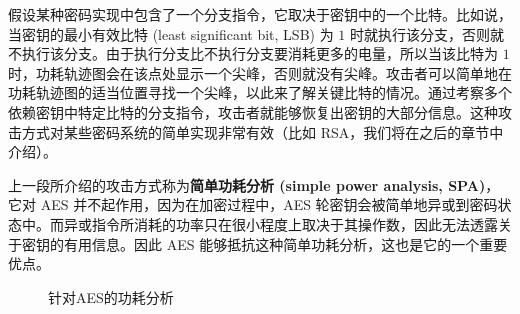 \begin{snote}[简单功耗分析。]
假设某种密码实现中包含了一个分支指令，它取决于密钥中的一个比特。比如说，当密钥的最小有效比特 (least significant bit, LSB) 为 $1$ 时就执行该分支，否则就不执行该分支。由于执行分支比不执行分支要消耗更多的电量，所以当该比特为 $1$ 时，功耗轨迹图会在该点处显示一个尖峰，否则就没有尖峰。攻击者可以简单地在功耗轨迹图的适当位置寻找一个尖峰，以此来了解关键比特的情况。通过考察多个依赖密钥中特定比特的分支指令，攻击者就能够恢复出密钥的大部分信息。这种攻击方式对某些密码系统的简单实现非常有效（比如 RSA，我们将在之后的章节中介绍）。

上一段所介绍的攻击方式称为\textbf{简单功耗分析 (simple power analysis, SPA)}，它对 AES 并不起作用，因为在加密过程中，AES 轮密钥会被简单地异或到密码状态中。而异或指令所消耗的功率只在很小程度上取决于其操作数，因此无法透露关于密钥的有用信息。因此 AES 能够抵抗这种简单功耗分析，这也是它的一个重要优点。
\end{snote}

\begin{figure}
  \centering
  \quad\quad\quad
  
  \quad\quad\quad
  \caption{针对AES的功耗分析}
\end{figure}

